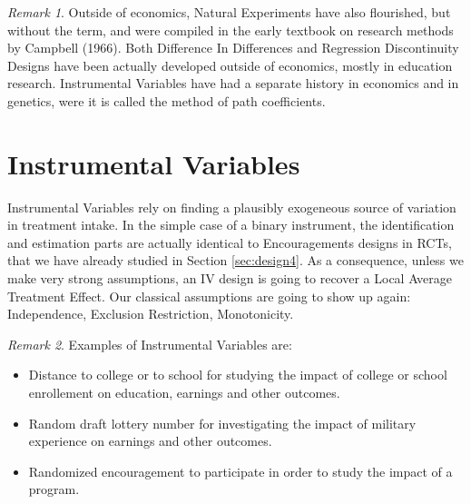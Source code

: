 \documentclass[
]{book}
\providecommand{\tightlist}{%
  \setlength{\itemsep}{0pt}\setlength{\parskip}{0pt}}
\theoremstyle{definition}
\theoremstyle{definition}
\theoremstyle{definition}
\theoremstyle{definition}
\theoremstyle{remark}
\newtheorem*{remark}{Remark}
\begin{document}
\begin{remark}
\iffalse{} {Remark. } \fi{}Outside of economics, Natural Experiments have also flourished, but without the term, and were compiled in the early textbook on research methods by Campbell (1966).
Both Difference In Differences and Regression Discontinuity Designs have been actually developed outside of economics, mostly in education research.
Instrumental Variables have had a separate history in economics and in genetics, were it is called the method of path coefficients.
\end{remark}

\hypertarget{instrumental-variables}{%
\section{Instrumental Variables}\label{instrumental-variables}}

Instrumental Variables rely on finding a plausibly exogeneous source of variation in treatment intake.
In the simple case of a binary instrument, the identification and estimation parts are actually identical to Encouragements designs in RCTs, that we have already studied in Section \ref{sec:design4}.
As a consequence, unless we make very strong assumptions, an IV design is going to recover a Local Average Treatment Effect.
Our classical assumptions are going to show up again: Independence, Exclusion Restriction, Monotonicity.

\begin{remark}
\iffalse{} {Remark. } \fi{}Examples of Instrumental Variables are:
\end{remark}

\begin{itemize}
\tightlist
\item
  Distance to college or to school for studying the impact of college or school enrollement on education, earnings and other outcomes.
\item
  Random draft lottery number for investigating the impact of military experience on earnings and other outcomes.
\item
  Randomized encouragement to participate in order to study the impact of a program.
\end{itemize}
\end{document}

